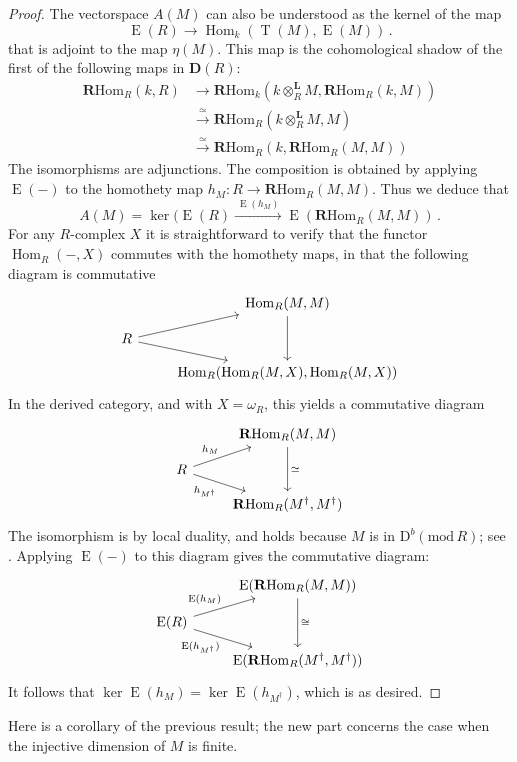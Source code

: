 \documentclass{amsart}
\numberwithin{equation}{section}
\theoremstyle{plain}
\theoremstyle{definition}
\theoremstyle{remark}
\newcommand{\dbcat}[1]{\mathrm{D}^b(\mathrm{mod}\,{#1})}
\newcommand{\dcat}{\mathbf{D}}
\newcommand{\eee}{\operatorname{E}}
\newcommand{\Hom}{\operatorname{Hom}}
\newcommand{\lotimes}{\otimes^{\mathbf L}}
\newcommand{\rhom}{\mathbf{R}\mathrm{Hom}}
\newcommand{\tee}{\operatorname{T}}
\begin{document}
\begin{proof}
The vectorspace $A(M)$ can also be understood as the kernel of the map
\[
\eee(R)\longrightarrow \Hom_k(\tee(M),\eee(M))\,.
\]
that is adjoint to the map $\eta(M)$. This map is the cohomological shadow of the first of the following maps in $\dcat(R)$:
\begin{align*}
\rhom_R(k,R)
  &\longrightarrow    \rhom_k(k\lotimes_RM,\rhom_R(k,M)) \\
  &\xrightarrow{\ \simeq\ } \rhom_R(k\lotimes_RM,M) \\
  &\xrightarrow{\ \simeq\ } \rhom_R(k,\rhom_R(M,M)) 
\end{align*}
 The isomorphisms are adjunctions. The composition is obtained by applying $\eee(-)$ to the homothety map  $h_M\colon R\to \rhom_R(M,M)$. Thus we deduce that
\[
A(M) = \ker (\eee(R) \xrightarrow{\ \eee(h_M)\ } \eee(\rhom_R(M,M))\,.
\]
For any $R$-complex $X$ it is straightforward to verify that the functor $\Hom_R(-,X)$ commutes with the homothety maps, in that the following diagram is commutative
\[
\begin{tikzcd}[row sep=small]
    & \Hom_R(M,M) \arrow[dd] \\
R\arrow[ur] \arrow[dr]  & \\
    & \Hom_R(\Hom_R(M,X),\Hom_R(M,X))
\end{tikzcd}
\]
In the derived category, and with $X=\omega_R$, this yields a commutative diagram 
\[
\begin{tikzcd}[row sep=small]
    & \rhom_R(M,M) \arrow[dd,"\simeq"] \\
R\arrow[ur,"h_M"] \arrow[dr,"h_{M^\dagger}" swap]  & \\
    & \rhom_R(M^\dagger,M^\dagger)
\end{tikzcd}
\]
The isomorphism is by local duality, and holds because $M$ is in $\dbcat R$; see \cite[\href{https://stacks.math.columbia.edu/tag/0A81}{Section 0A81}]{stacks-project}. Applying $\eee(-)$ to this diagram gives the commutative diagram:
\[
\begin{tikzcd}[row sep=small]
    & \eee(\rhom_R(M,M)) \arrow[dd,"\cong"] \\
\eee(R)\arrow[ur,"\eee(h_M)"] \arrow[dr,"\eee(h_{M^\dagger})" swap]  & \\
    & \eee(\rhom_R(M^\dagger,M^\dagger))
\end{tikzcd}
\]
It follows that $\ker \eee(h_M)=\ker \eee(h_{M^\dagger})$, which is as desired.
\end{proof}

Here is a corollary of the previous result; the new part concerns the case when the injective dimension of $M$ is finite.
\end{document}
